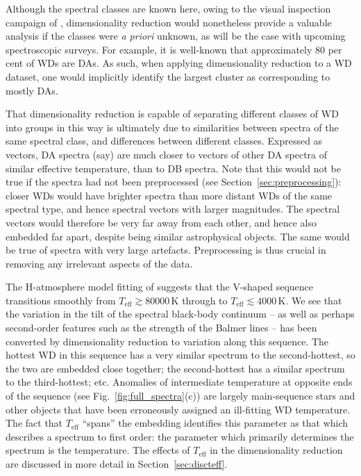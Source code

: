 \documentclass[fleqn,usenatbib]{mnras}
\def\Teff{T_\mathrm{eff}}
\begin{document}
Although the spectral classes are known here, owing to the visual inspection campaign of \citet{manser24}, dimensionality reduction would nonetheless provide a valuable analysis if the classes were \textit{a priori} unknown, as will be the case with upcoming spectroscopic surveys.
For example, it is well-known that approximately 80 per cent of WDs are DAs.
As such, when applying dimensionality reduction to a WD dataset, one would implicitly identify the largest cluster as corresponding to mostly DAs.

That dimensionality reduction is capable of separating different classes of WD into groups in this way is ultimately due to similarities between spectra of the same spectral class, and differences between different classes.
Expressed as vectors, DA spectra (say) are much closer to vectors of other DA spectra of similar effective temperature, than to DB spectra.
Note that this would not be true if the spectra had not been preprocessed (see Section~\ref{sec:preprocessing}): closer WDs would have brighter spectra than more distant WDs of the same spectral type, and hence spectral vectors with larger magnitudes.
The spectral vectors would therefore be very far away from each other, and hence also embedded far apart, despite being similar astrophysical objects.
The same would be true of spectra with very large artefacts.
Preprocessing is thus crucial in removing any irrelevant aspects of the data.

The H-atmosphere model fitting of \citet{gentilefusillo19} suggests that the V-shaped sequence transitions smoothly from $\Teff \gtrsim 80000\,\text{K}$ through to $\Teff \lesssim 4000\,\text{K}$.
We see that the variation in the tilt of the spectral black-body continuum -- as well as perhaps second-order features such as the strength of the Balmer lines -- has been converted by dimensionality reduction to variation along this sequence.
The hottest WD in this sequence has a very similar spectrum to the second-hottest, so the two are embedded close together; the second-hottest has a similar spectrum to the third-hottest; etc.
Anomalies of intermediate temperature at opposite ends of the sequence (see Fig.~\ref{fig:full_spectra}(c)) are largely main-sequence stars and other objects that have been erroneously assigned an ill-fitting WD temperature.
The fact that $\Teff$ ``spans'' the embedding identifies this parameter as that which describes a spectrum to first order: the parameter which primarily determines the spectrum is the temperature.
The effects of $\Teff$ in the dimensionality reduction are discussed in more detail in Section~\ref{sec:discteff}.
\end{document}
